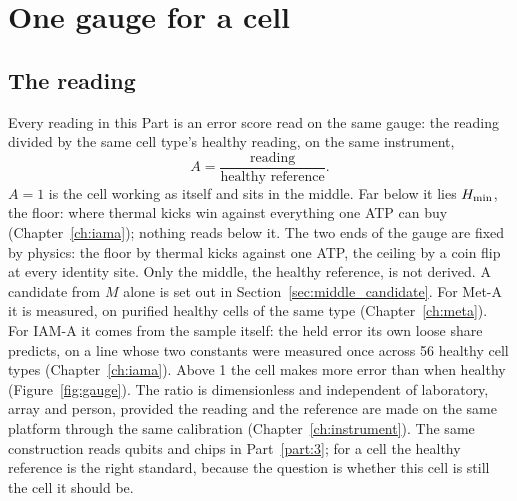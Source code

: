 \chapter{One gauge for a cell}\label{ch:gauge}

\section{The reading}

Every reading in this Part is an error score read on the same gauge: the reading divided by the same cell type's healthy
reading, on the same instrument,
\begin{equation}
  A=\frac{\text{reading}}{\text{healthy reference}} .
  \label{eq:A}
\end{equation}
$A=1$ is the cell working as itself and sits in the middle. Far below it lies $H_{\min}$, the floor: where thermal kicks win against everything one ATP can buy
(Chapter~\ref{ch:iama}); nothing reads below it. The two ends of the gauge are fixed by physics: the floor by thermal kicks against one ATP,
the ceiling by a coin flip at every identity site. \derived{} Only the middle, the healthy reference, is not derived. A candidate from $M$ alone is set out in Section~\ref{sec:middle_candidate}. \conjecture{} For Met-A it is measured, on purified healthy cells of the same type (Chapter~\ref{ch:meta}). \measured{} For IAM-A it comes from the sample itself: the held error its own loose share predicts, on a line whose two constants were measured once across 56 healthy cell types (Chapter~\ref{ch:iama}). \measured{} Above 1 the cell makes more error than when healthy
(Figure~\ref{fig:gauge}). The ratio is dimensionless and independent of laboratory, array and person, provided the reading
and the reference are made on the same platform through the same calibration (Chapter~\ref{ch:instrument}). The same
construction reads qubits and chips in Part~\ref{part:3}; for a cell the healthy reference is the right standard,
because the question is whether this cell is still the cell it should be.

